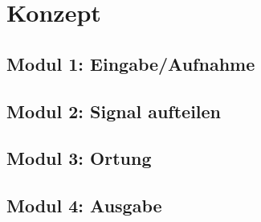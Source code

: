   \section{Konzept} 
      \subsection{Modul 1: Eingabe/Aufnahme}
      \subsection{Modul 2: Signal aufteilen}
      \subsection{Modul 3: Ortung}
      \subsection{Modul 4: Ausgabe}
